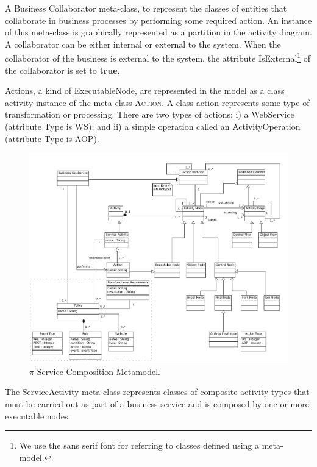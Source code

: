 \begin{itemizedTrivlist}
\item A {\sc Business Collaborator} meta-class, to represent the classes of entities that collaborate in  business processes by performing some  required action. 
An instance of this meta-class is graphically represented as a partition in the activity diagram. 
A collaborator can be either internal or external to the system. 
When the collaborator of the business is external to the system, the attribute {\sf IsExternal}\footnote{We use the {\sf sans serif} font for referring to classes defined using a meta-model.} of the collaborator is set to \textbf{true}.

\item {\sc Action}s, a kind of {\sc ExecutableNode}, are represented in the model as a class activity instance of the meta-class \textsc{Action}. 
A class action represents some type of transformation or processing. 
There are two types of actions: i) a WebService (attribute Type is {\sf WS}); and ii) a simple operation called an {\sc ActivityOperation} (attribute Type is {\sc AOP}).

\begin{figure}[t]
\centering 
\includegraphics[width=1.0\textwidth]{figs/PiServiceComposition} 
\caption{$\pi$-Service Composition Metamodel.}
\label{fig:e-scomposition-metamodel}
\end{figure}

\item The {\sc ServiceActivity} meta-class represents classes of composite activity types that must be carried out as part of a business service and is composed by one or more executable nodes.


\end{itemizedTrivlist}
